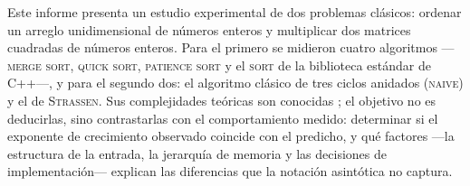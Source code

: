 
Este informe presenta un estudio experimental de dos problemas clásicos: ordenar
un arreglo unidimensional de números enteros y multiplicar dos matrices
cuadradas de números enteros. Para el primero se midieron cuatro algoritmos
---\textsc{merge sort}, \textsc{quick sort}, \textsc{patience sort} y el
\textsc{sort} de la biblioteca estándar de C++---, y para el segundo dos: el
algoritmo clásico de tres ciclos anidados (\textsc{naive}) y el de
\textsc{Strassen}. Sus complejidades teóricas son conocidas \cite{cormen2009};
el objetivo no es deducirlas, sino contrastarlas con el comportamiento medido:
determinar si el exponente de crecimiento observado coincide con el predicho, y
qué factores ---la estructura de la entrada, la jerarquía de memoria y las
decisiones de implementación--- explican las diferencias que la notación
asintótica no captura.
